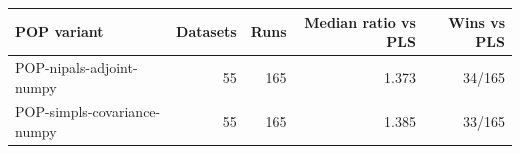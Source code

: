 \begin{tabularx}{\linewidth}{Xrrrr}
\toprule
POP variant & Datasets & Runs & Median ratio vs PLS & Wins vs PLS \\
\midrule
POP-nipals-adjoint-numpy & 55 & 165 & 1.373 & 34/165 \\
POP-simpls-covariance-numpy & 55 & 165 & 1.385 & 33/165 \\
\bottomrule
\end{tabularx}
